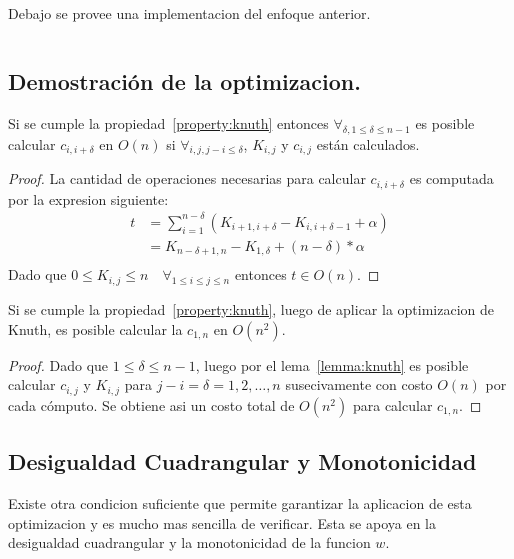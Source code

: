 \documentclass[spanish]{llncs}
\begin{document}
Debajo se provee una implementacion del enfoque anterior.
\inputminted{python}{optimized.py} %

\subsection{Demostración de la optimizacion.}

\begin{lemma}
	\label{lemma:knuth}
	Si se cumple la propiedad~\ref{property:knuth} entonces 
	$\forall_{\delta, 1 \le \delta \le n-1}$ es posible calcular
	$c_{i,i+\delta}$ en $O(n)$ si $\forall_{i,j,j-i \le \delta}$,
	$K_{i,j}$ y $c_{i,j}$ están calculados.
\end{lemma}

\begin{proof}
	La cantidad de operaciones necesarias para calcular $c_{i,i+\delta}$
	es computada por la expresion siguiente:
	\begin{equation*}
		\begin{split}
			t &= \sum_{i=1}^{n-\delta}(K_{i+1,i+\delta} - K_{i,i+\delta-1} + \alpha) \\
			&= K_{n-\delta+1,n} - K_{1,\delta} + (n-\delta)*\alpha \\
		\end{split}
	\end{equation*}
	Dado que $0 \le K_{i,j} \le n \quad \forall_{1 \le i \le j \le n}$ entonces $t \in O(n)$.
\end{proof}

\begin{theorem}
	\label{theorem:knuth}
	Si se cumple la propiedad~\ref{property:knuth}, luego de aplicar la optimizacion de Knuth,
	es posible calcular la $c_{1,n}$ en $O(n^2)$.
\end{theorem}

\begin{proof}
	Dado que $1 \le \delta \le n-1$, luego por el lema~\ref{lemma:knuth} es posible calcular
	$c_{i,j}$ y $K_{i,j}$ para $j-i = \delta = 1, 2, \dots, n$ susecivamente con costo $O(n)$
	por cada cómputo. Se obtiene asi un costo total de $O(n^2)$ para calcular $c_{1,n}$.
\end{proof}

\subsection{Desigualdad Cuadrangular y Monotonicidad}

Existe otra condicion suficiente que permite garantizar la aplicacion de esta optimizacion
y es mucho mas sencilla de verificar. Esta se apoya en la desigualdad cuadrangular y la
monotonicidad de la funcion $w$.
\end{document}
